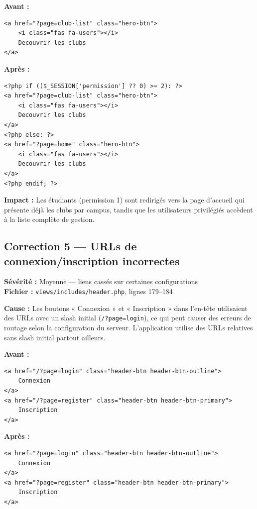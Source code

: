 \documentclass[12pt,a4paper]{article}
\begin{document}
\textbf{Avant :}
\begin{lstlisting}
<a href="?page=club-list" class="hero-btn">
    <i class="fas fa-users"></i>
    Decouvrir les clubs
</a>
\end{lstlisting}

\textbf{Après :}
\begin{lstlisting}
<?php if (($_SESSION['permission'] ?? 0) >= 2): ?>
<a href="?page=club-list" class="hero-btn">
    <i class="fas fa-users"></i>
    Decouvrir les clubs
</a>
<?php else: ?>
<a href="?page=home" class="hero-btn">
    <i class="fas fa-users"></i>
    Decouvrir les clubs
</a>
<?php endif; ?>
\end{lstlisting}

\textbf{Impact :} Les étudiants (permission 1) sont redirigés vers la page
d'accueil qui présente déjà les clubs par campus, tandis que les utilisateurs
privilégiés accèdent à la liste complète de gestion.

\subsection{Correction 5 — URLs de connexion/inscription incorrectes}

\begin{mdframed}[backgroundcolor=warning!20, linecolor=warning, linewidth=1.5pt]
\textbf{Sévérité :} Moyenne — liens cassés sur certaines configurations\\
\textbf{Fichier :} \texttt{views/includes/header.php}, lignes 179--184
\end{mdframed}

\vspace{0.5cm}
\textbf{Cause :} Les boutons « Connexion » et « Inscription » dans l'en-tête
utilisaient des URLs avec un slash initial (\texttt{/?page=login}), ce qui
peut causer des erreurs de routage selon la configuration du serveur.
L'application utilise des URLs relatives sans slash initial partout ailleurs.

\textbf{Avant :}
\begin{lstlisting}
<a href="/?page=login" class="header-btn header-btn-outline">
    Connexion
</a>
<a href="/?page=register" class="header-btn header-btn-primary">
    Inscription
</a>
\end{lstlisting}

\textbf{Après :}
\begin{lstlisting}
<a href="?page=login" class="header-btn header-btn-outline">
    Connexion
</a>
<a href="?page=register" class="header-btn header-btn-primary">
    Inscription
</a>
\end{lstlisting}
\end{document}

